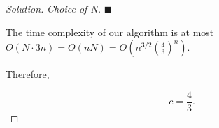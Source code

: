 \documentclass{article}
\renewcommand{\qedsymbol}{\hfill $\blacksquare$\par}
\newenvironment{solution}{\begin{proof}[\noindent\it Solution]}{\end{proof}}
\begin{document}
\begin{solution}
    \vspace{-3.3em}\hspace{35.5em} \textit{Choice of N.} \qedsymbol
    
    \vspace{3em} \hspace{2.6em}
    The time complexity of our algorithm is at most $O(N\cdot 3n) = O(nN) = O\left(n^{3/2}\left(\frac{4}{3}\right)^n\right).$
    
    \hspace{2.6em}
    Therefore, 
    
    \vspace{-1.5em}
    $$c = \frac{4}{3}.$$
    
    \vspace{-2.4em}
\end{solution}
\end{document}

